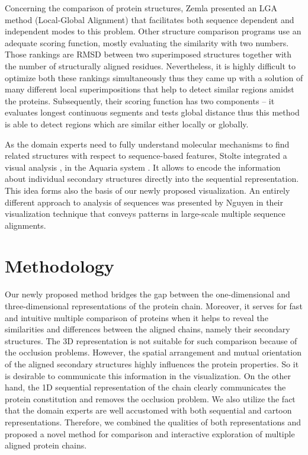 \documentclass[twocolumn]{bmcart}%
\begin{document}
Concerning the comparison of protein structures, Zemla presented an LGA method (Local-Global Alignment) \cite{Zemla2003} that facilitates both sequence dependent and independent modes to this problem.
Other structure comparison programs use an adequate scoring function, mostly evaluating the similarity with two numbers.
Those rankings are RMSD between two superimposed structures together with the number of structurally aligned residues.
Nevertheless, it is highly difficult to optimize both these rankings simultaneously thus they came up with a solution of many different local superimpositions that help to detect similar regions amidst the proteins.
Subsequently, their scoring function has two components -- it evaluates longest continuous segments and tests global distance thus this method is able to detect regions which are similar either locally or globally.

As the domain experts need to fully understand molecular mechanisms to find related structures with respect to sequence-based features, Stolte integrated a visual analysis \cite{Stolte2015}, in the Aquaria system \cite{odonoghue2015}.
It allows to encode the information about individual secondary structures directly into the sequential representation.
This idea forms also the basis of our newly proposed visualization.
An entirely different approach to analysis of sequences was presented by Nguyen \cite{Nguyen2013} in their visualization technique that conveys patterns in large-scale multiple sequence alignments.


\section*{Methodology}
Our newly proposed method bridges the gap between the one-dimensional and three-dimensional representations of the protein chain.
Moreover, it serves for fast and intuitive multiple comparison of proteins when it helps to reveal the similarities and differences between the aligned chains, namely their secondary structures.
The 3D representation is not suitable for such comparison because of the occlusion problems.
However, the spatial arrangement and mutual orientation of the aligned secondary structures highly influences the protein properties.
So it is desirable to communicate this information in the visualization.
On the other hand, the 1D sequential representation of the chain clearly communicates the protein constitution and removes the occlusion problem.
We also utilize the fact that the domain experts are well accustomed with both sequential and cartoon representations.
Therefore, we combined the qualities of both representations and proposed a novel method for comparison and interactive exploration of multiple aligned protein chains.
\end{document}
